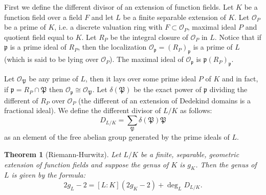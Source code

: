 \documentclass[12pt]{article}
\newtheorem*{thm}{Theorem}
\theoremstyle{definition}
\begin{document}
First we define the different divisor of an extension of function fields. Let $K$ be a function field over a field $F$ and let $L$ be a finite separable extension of $K$. Let $\mathcal{O}_P$ be a prime of $K$, i.e. a discrete valuation ring with $F\subset \mathcal{O}_P$, maximal ideal $P$ and quotient field equal to $K$. Let $R_P$ be the integral closure of $\mathcal{O}_P$ in $L$. Notice that if $\mathfrak{p}$ is a prime ideal of $R_P$, then the localization $\mathcal{O}_{\mathfrak{p}}=(R_P)_{\mathfrak{p}}$ is a prime of $L$ (which is said to be lying over $\mathcal{O}_P$). The maximal ideal of $\mathcal{O}_{\mathfrak{p}}$ is $\mathfrak{p}(R_P)_{\mathfrak{p}}$.

Let $\mathcal{O}_\mathfrak{P}$ be any prime of $L$, then it lays over some prime ideal $P$ of $K$ and in fact, if $\mathfrak{p}=R_P\cap \mathfrak{P}$ then $\mathcal{O}_\mathfrak{p}\cong \mathcal{O}_\mathfrak{P}$. Let $\delta(\mathfrak{P})$ be the exact power of $\mathfrak{p}$ dividing the different  of $R_P$ over $\mathcal{O}_P$ (the different of an extension of Dedekind domains is a fractional ideal). We define the different divisor of $L/K$ as follows:
$$D_{L/K}=\sum_\mathfrak{P} \delta({\mathfrak{P}})\mathfrak{P}$$
as an element of the free abelian group generated by the prime ideals of $L$.

\begin{thm}[Riemann-Hurwitz]
Let $L/K$ be a finite, separable, geometric extension of function fields and suppose the genus of $K$ is $g_K$. Then the genus of $L$ is given by the formula:
$$2g_L-2=[L:K](2g_K-2)+\deg_L D_{L/K}.$$
\end{thm}
\end{document}
